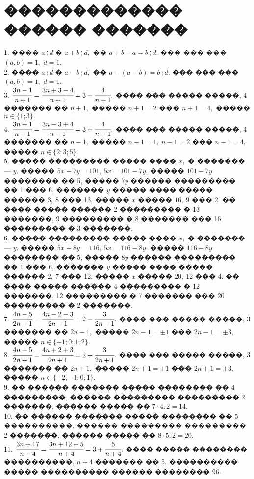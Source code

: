 \documentclass[12pt]{article}
\begin{document}
\section{������������� ������ �������}
1. ���� $a\ \vdots\ d$ � $a+b\ \vdots\ d,$ �� $a+b-a=b\ \vdots\ d.$ ��� ��� ���$(a, b)=1,$ $d=1.$\\
2. ���� $a\ \vdots\ d$ � $a-b\ \vdots\ d,$ �� $a-(a-b)=b\ \vdots\ d.$ ��� ��� ���$(a, b)=1,$ $d=1.$\\
3. $\cfrac{3n-1}{n+1}=\cfrac{3n+3-4}{n+1}=3-\cfrac{4}{n+1}.$ ���� ��� ����� �����, 4 ������� �� $n+1,$ ����� $n+1=2$ ��� $n+1=4,$
����� $n\in\{1; 3\}.$\\
4. $\cfrac{3n+1}{n-1}=\cfrac{3n-3+4}{n-1}=3+\cfrac{4}{n-1}.$ ���� ��� ����� �����, 4 ������� �� $n-1,$ ����� $n-1=1,\ n-1=2$ ��� $n-1=4,$
����� $n\in\{2; 3; 5\}.$\\
5. ����� ��������� ����� ���� $x,$ � ������� --- $y.$ �����  $5x+7y=101,\ 5x=101-7y.$ ����� $101-7y$ �������� �� 5, ����� $7y$ ������ ��������� �� 1 ��� 6, ������� $y$ ����� ���� ����� ������ $3,\ 8$ ��� 13, ����� $x$ ����� $16,\ 9$ ��� 2. �� ���� ����� ������ 2 ��������� � 13 �������, 9 ��������� � 8 ������� ��� 16 ��������� � 3 �������.\\
6. ����� ��������� ����� ���� $x,$ � ������� --- $y.$ �����  $5x+8y=116,\ 5x=116-8y.$ ����� $116-8y$ �������� �� 5, ����� $8y$ ������ ��������� �� 1 ��� 6, ������� $y$ ����� ���� ����� ������ $2,\ 7$ ��� 12, ����� $x$ ����� $20,\ 12$ ��� 4. �� ���� ����� ������ 4 ��������� � 12 �������, 12 ��������� � 7 ������� ��� 20 ��������� � 2 �������.\\
7. $\cfrac{4n-5}{2n-1}=\cfrac{4n-2-3}{2n-1}=2-\cfrac{3}{2n-1}.$ ���� ��� ����� �����, 3 ������� �� $2n-1,$ ����� $2n-1=\pm1$ ��� $2n-1=\pm3,$ �����
$n\in\{-1; 0; 1; 2\}.$\\
8. $\cfrac{4n+5}{2n+1}=\cfrac{4n+2+3}{2n+1}=2+\cfrac{3}{2n+1}.$ ���� ��� ����� �����, 3 ������� �� $2n+1,$ ����� $2n+1=\pm1$ ��� $2n+1=\pm3,$ �����
$n\in\{-2; -1; 0; 1\}.$\\
9. �� ������ ������� ����� �������� �� 4 ���������, ������ ��������� ��������� 2 �������, ������ ����� �� $7\cdot4:2=14.$\\
10. �� ������ ������� ����� �������� �� 5 ����������, ������ ��������� ��������� 2 �������, ������ ����� �� $8\cdot5:2=20.$\\
11. $\cfrac{3n+17}{n+4}=\cfrac{3n+12+5}{n+4}=3+\cfrac{5}{n+4}.$ ���� ����� �������� ����������, $n+4$ ������� �� 5. ���������� ����� ���������� ������ �������� 96.\\
\end{document}
